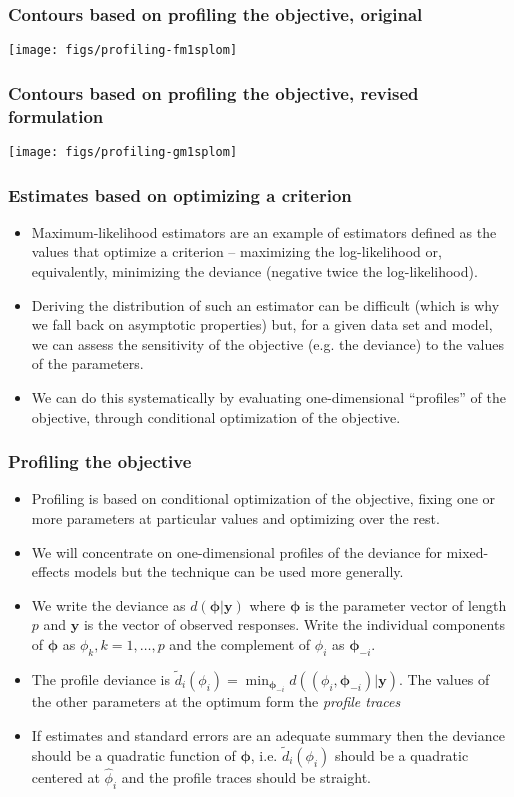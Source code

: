 \documentclass[dvipsnames,pdflatex,beamer]{beamer}
\begin{document}
\begin{frame}[fragile]
  \frametitle{Contours based on profiling the objective, original}
\texttt{[image: figs/profiling-fm1splom]}
\end{frame}
\begin{frame}[fragile]
  \frametitle{Contours based on profiling the objective, revised formulation}
\texttt{[image: figs/profiling-gm1splom]}
\end{frame}
\begin{frame}
  \frametitle{Estimates based on optimizing a criterion}
  \begin{itemize}
  \item Maximum-likelihood estimators are an example of estimators
    defined as the values that optimize a criterion -- maximizing the
    log-likelihood or, equivalently, minimizing the deviance (negative
    twice the log-likelihood).
  \item Deriving the distribution of such an estimator can be
    difficult (which is why we fall back on asymptotic properties) but,
    for a given data set and model, we can assess the sensitivity of
    the objective (e.g. the deviance) to the values of the parameters.
  \item We can do this systematically by evaluating one-dimensional
    ``profiles'' of the objective, through conditional optimization of
    the objective.
  \end{itemize}
\end{frame}
\begin{frame}
  \frametitle{Profiling the objective}
  \begin{itemize}
  \item Profiling is based on conditional optimization of the
    objective, fixing one or more parameters at particular values and
    optimizing over the rest.
  \item We will concentrate on one-dimensional profiles of the
    deviance for mixed-effects models but the technique can be used
    more generally.
  \item We write the deviance as $d(\bm\phi|\bm y)$ where $\bm\phi$ is
    the parameter vector of length $p$ and $\bm y$ is the vector of observed
    responses.  Write the individual components of $\bm\phi$ as
    $\phi_k,k=1,\dots,p$ and the complement of $\phi_i$ as $\bm\phi_{-i}$.
  \item The profile deviance is $\tilde{d}_i(\phi_i)=\min_{\bm\phi_{-i}}d((\phi_i,\bm\phi_{-i})|\bm y)$.
    The values of the other parameters at the optimum form the
    \emph{profile traces}
  \item If estimates and standard errors are an adequate summary then
    the deviance should be a quadratic function of $\bm\phi$, i.e.{}
    $\tilde{d}_i(\phi_i)$ should be a quadratic centered at $\hat{\phi}_i$
    and the profile traces should be straight.
  \end{itemize}
\end{frame}
\end{document}
